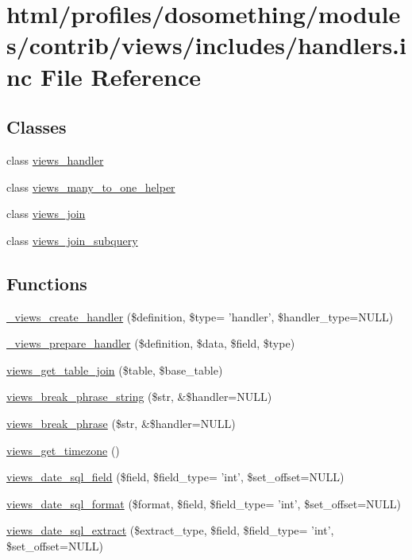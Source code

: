\hypertarget{handlers_8inc}{
\section{html/profiles/dosomething/modules/contrib/views/includes/handlers.inc File Reference}
\label{handlers_8inc}
}
\subsection*{Classes}
\begin{DoxyCompactItemize}
\item 
class \hyperlink{classviews__handler}{views\_\-handler}
\item 
class \hyperlink{classviews__many__to__one__helper}{views\_\-many\_\-to\_\-one\_\-helper}
\item 
class \hyperlink{classviews__join}{views\_\-join}
\item 
class \hyperlink{classviews__join__subquery}{views\_\-join\_\-subquery}
\end{DoxyCompactItemize}
\subsection*{Functions}
\begin{DoxyCompactItemize}
\item 
\hyperlink{handlers_8inc_adb01fd80de3fb9f4583b2ae5e6dcd5be}{\_\-views\_\-create\_\-handler} (\$definition, \$type= 'handler', \$handler\_\-type=NULL)
\item 
\hyperlink{handlers_8inc_ad181d2d2434c64eee6344b0eeb1fa074}{\_\-views\_\-prepare\_\-handler} (\$definition, \$data, \$field, \$type)
\item 
\hyperlink{handlers_8inc_a76ba5af63134db1102702696a50ba6f5}{views\_\-get\_\-table\_\-join} (\$table, \$base\_\-table)
\item 
\hyperlink{handlers_8inc_a6f75075f134aec561d058af4949a2602}{views\_\-break\_\-phrase\_\-string} (\$str, \&\$handler=NULL)
\item 
\hyperlink{handlers_8inc_abe4b24879b13b3e43ad741951af113e0}{views\_\-break\_\-phrase} (\$str, \&\$handler=NULL)
\item 
\hyperlink{handlers_8inc_a3bd8b0bf769dc6d068349b222edb410c}{views\_\-get\_\-timezone} ()
\item 
\hyperlink{handlers_8inc_ae61b1af2423ecd6df2332d716f980234}{views\_\-date\_\-sql\_\-field} (\$field, \$field\_\-type= 'int', \$set\_\-offset=NULL)
\item 
\hyperlink{handlers_8inc_a7916ceb65f4cbc07601e2acae923374e}{views\_\-date\_\-sql\_\-format} (\$format, \$field, \$field\_\-type= 'int', \$set\_\-offset=NULL)
\item 
\hyperlink{handlers_8inc_add4a1d7bb4ea764872603f9f56afaab1}{views\_\-date\_\-sql\_\-extract} (\$extract\_\-type, \$field, \$field\_\-type= 'int', \$set\_\-offset=NULL)
\end{DoxyCompactItemize}



